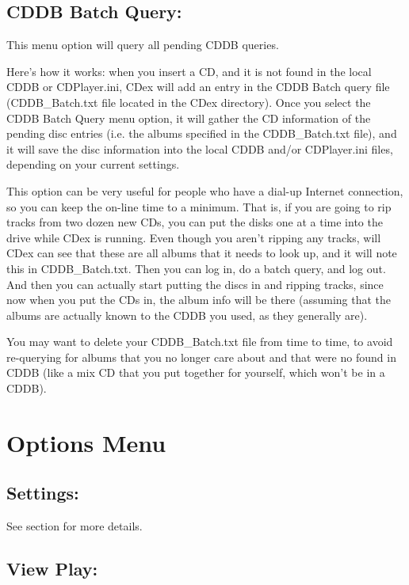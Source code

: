 \subsection{CDDB Batch Query:}

This menu option will query all pending CDDB queries.

Here's how it works:
when you insert a CD, and it is not found in the local CDDB or CDPlayer.ini,
CDex will add an entry in the CDDB Batch query file (CDDB_Batch.txt file located
in the CDex directory). Once you select the CDDB Batch Query menu option, it 
will gather the CD information of the pending disc entries (i.e. the albums
specified in the CDDB_Batch.txt file), and it will save the disc information into
the local CDDB and/or CDPlayer.ini files, depending on your current settings.


This option can be very useful for people who have a dial-up Internet connection,
so you can keep the on-line time to a minimum.  That is, if you are going to rip
tracks from two dozen new CDs, you can put the disks one at a time into the drive
while CDex is running.  Even though you aren't ripping any tracks,
will CDex can see that these are all albums that it needs to look up, and it will
note this in CDDB_Batch.txt.  Then you can log in, do a batch query, and log out.
And then you can actually start putting the discs in and ripping tracks, since now
when you put the CDs in, the album info will be there (assuming that the albums
are actually known to the CDDB you used, as they generally are).

You may want to delete your CDDB_Batch.txt file from time to time,
to avoid re-querying for albums that you no longer care about and that were
no found in CDDB (like a mix CD that you put together for yourself, which won't
be in a CDDB).


\section{Options Menu}


\subsection{Settings:}

See section  for more details.


\subsection{View Play:}

